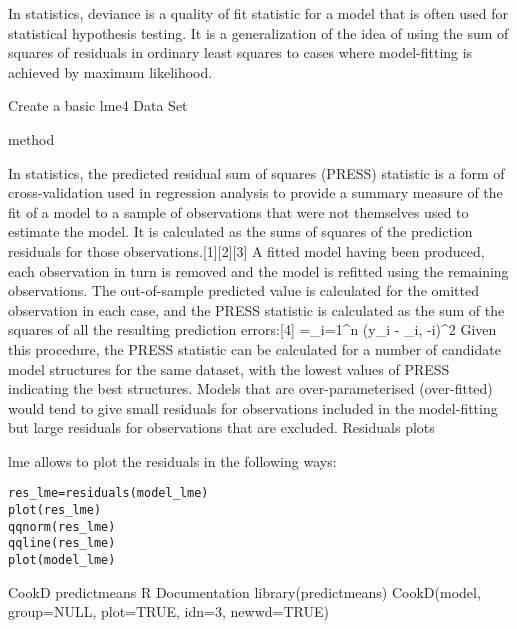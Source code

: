 In statistics, deviance is a quality of fit statistic for a model that is often used for statistical hypothesis testing. It is a generalization of the idea of using the sum of squares of residuals in ordinary least squares to cases where model-fitting is achieved by maximum likelihood.

Create a basic lme4 Data Set
 
method 


In statistics, the predicted residual sum of squares (PRESS) statistic is a form of cross-validation used in regression analysis to provide a summary measure of the fit of a model to a sample of observations that were not themselves used to estimate the model. It is calculated as the sums of squares of the prediction residuals for those observations.[1][2][3]
A fitted model having been produced, each observation in turn is removed and the model is refitted using the remaining observations. The out-of-sample predicted value is calculated for the omitted observation in each case, and the PRESS statistic is calculated as the sum of the squares of all the resulting prediction errors:[4]
 =\sum_{i=1}^n (y_i - _{i, -i})^2 
Given this procedure, the PRESS statistic can be calculated for a number of candidate model structures for the same dataset, with the lowest values of PRESS indicating the best structures. Models that are over-parameterised (over-fitted) would tend to give small residuals for observations included in the model-fitting but large residuals for observations that are excluded.
Residuals plots

lme allows to plot the residuals in the following ways:

\begin{framed}
\begin{verbatim}
res_lme=residuals(model_lme)
plot(res_lme)
qqnorm(res_lme)
qqline(res_lme)
plot(model_lme)
\end{verbatim}
\end{framed}


CookD {predictmeans}	R Documentation
library(predictmeans)
CookD(model, group=NULL, plot=TRUE, idn=3, newwd=TRUE)


